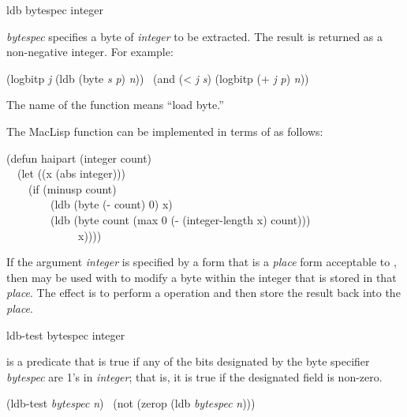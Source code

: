 \begin{defun}[Function]
ldb bytespec integer

\emph{bytespec} specifies a byte of \emph{integer} to be extracted.
The result is returned as a non-negative integer.
For example:
\begin{lisp}
(logbitp \emph{j} (ldb (byte \emph{s} \emph{p}) \emph{n})) \EQ\ (and (< \emph{j} \emph{s}) (logbitp (+ \emph{j} \emph{p}) \emph{n}))
\end{lisp}
The name of the function  means ``load byte.''

\beforenoterule
\begin{incompatibility}
The MacLisp function  can be
implemented in terms of  as follows:
\begin{lisp}
(defun haipart (integer count) \\
~~(let ((x (abs integer))) \\
~~~~(if (minusp count) \\
~~~~~~~~(ldb (byte (- count) 0) x) \\
~~~~~~~~(ldb (byte count (max 0 (- (integer-length x) count))) \\
~~~~~~~~~~~~~x))))
\end{lisp}
\end{incompatibility}
\afternoterule

If the argument \emph{integer} is specified by a form that is a \emph{place} form
acceptable to , then
 may be used with  to modify
a byte within the integer that is stored
in that \emph{place}.
The effect is to perform a  operation
and then store the result back into the \emph{place}.
\end{defun}

\begin{defun}[Function]
ldb-test bytespec integer

 is a predicate that is true if any of
the bits designated by the byte specifier \emph{bytespec} are 1's in \emph{integer};
that is, it is true if the designated field is non-zero.
\begin{lisp}
(ldb-test \emph{bytespec} \emph{n}) \EQ\ (not (zerop (ldb \emph{bytespec} \emph{n})))
\end{lisp}
\end{defun}

